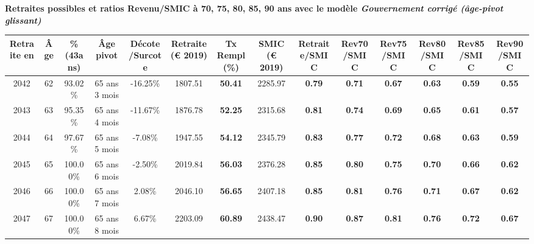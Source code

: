  \vspace{0.1cm} 
{\bf \noindent Retraites possibles et ratios Revenu/SMIC à 70, 75, 80, 85, 90 ans avec le modèle \emph{Gouvernement corrigé (âge-pivot glissant)}}  
 
\begin{adjustbox}{max width=\textwidth} 
\begin{tabular}[htb]{|c|c||c|c|c||c|c||c||c|c|c|c|c|c|} 
\hline 
 Retraite en &  Âge &  \%(43ans) &  Âge pivot &  Décote/Surcote &  Retraite (\euro{} 2019) &  Tx Rempl(\%) &  SMIC (\euro{} 2019) &  Retraite/SMIC &  Rev70/SMIC &  Rev75/SMIC &  Rev80/SMIC &  Rev85/SMIC &  Rev90/SMIC \\ 
\hline \hline 
 2042 &  62 &  93.02\% &  65 ans 3 mois &  -16.25\% &  1807.51 &  {\bf 50.41} &  2285.97 &  {\bf {\color{red} 0.79}} &  {\bf {\color{red} 0.71}} &  {\bf {\color{red} 0.67}} &  {\bf {\color{red} 0.63}} &  {\bf {\color{red} 0.59}} &  {\bf {\color{red} 0.55}} \\ 
\hline 
 2043 &  63 &  95.35\% &  65 ans 4 mois &  -11.67\% &  1876.78 &  {\bf 52.25} &  2315.68 &  {\bf {\color{red} 0.81}} &  {\bf {\color{red} 0.74}} &  {\bf {\color{red} 0.69}} &  {\bf {\color{red} 0.65}} &  {\bf {\color{red} 0.61}} &  {\bf {\color{red} 0.57}} \\ 
\hline 
 2044 &  64 &  97.67\% &  65 ans 5 mois &  -7.08\% &  1947.55 &  {\bf 54.12} &  2345.79 &  {\bf {\color{red} 0.83}} &  {\bf {\color{red} 0.77}} &  {\bf {\color{red} 0.72}} &  {\bf {\color{red} 0.68}} &  {\bf {\color{red} 0.63}} &  {\bf {\color{red} 0.59}} \\ 
\hline 
 2045 &  65 &  100.00\% &  65 ans 6 mois &  -2.50\% &  2019.84 &  {\bf 56.03} &  2376.28 &  {\bf {\color{red} 0.85}} &  {\bf {\color{red} 0.80}} &  {\bf {\color{red} 0.75}} &  {\bf {\color{red} 0.70}} &  {\bf {\color{red} 0.66}} &  {\bf {\color{red} 0.62}} \\ 
\hline 
 2046 &  66 &  100.00\% &  65 ans 7 mois &  2.08\% &  2046.10 &  {\bf 56.65} &  2407.18 &  {\bf {\color{red} 0.85}} &  {\bf {\color{red} 0.81}} &  {\bf {\color{red} 0.76}} &  {\bf {\color{red} 0.71}} &  {\bf {\color{red} 0.67}} &  {\bf {\color{red} 0.62}} \\ 
\hline 
 2047 &  67 &  100.00\% &  65 ans 8 mois &  6.67\% &  2203.09 &  {\bf 60.89} &  2438.47 &  {\bf {\color{red} 0.90}} &  {\bf {\color{red} 0.87}} &  {\bf {\color{red} 0.81}} &  {\bf {\color{red} 0.76}} &  {\bf {\color{red} 0.72}} &  {\bf {\color{red} 0.67}} \\ 
\hline 
\hline 
\end{tabular} 
\end{adjustbox} 
 
